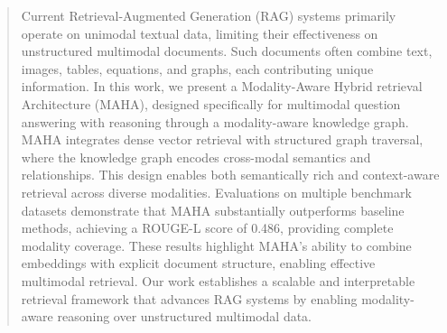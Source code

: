 \documentclass{svproc}
\begin{document}
\begin{abstract}



Current Retrieval-Augmented Generation (RAG) systems primarily operate on unimodal textual data, limiting their effectiveness on unstructured multimodal documents. Such documents often combine text, images, tables, equations, and graphs, each contributing unique information. In this work, we present a Modality-Aware Hybrid retrieval Architecture (MAHA), designed specifically for multimodal question answering with reasoning through a modality-aware knowledge graph. MAHA integrates dense vector retrieval with structured graph traversal, where the knowledge graph encodes cross-modal semantics and relationships. This design enables both semantically rich and context-aware retrieval across diverse modalities. Evaluations on multiple benchmark datasets demonstrate that MAHA substantially outperforms baseline methods, achieving a ROUGE-L score of 0.486, providing complete modality coverage. These results highlight MAHA’s ability to combine embeddings with explicit document structure, enabling effective multimodal retrieval. Our work establishes a scalable and interpretable retrieval framework that advances RAG systems by enabling modality-aware reasoning over unstructured multimodal data.


\end{abstract}
%
\end{document}
